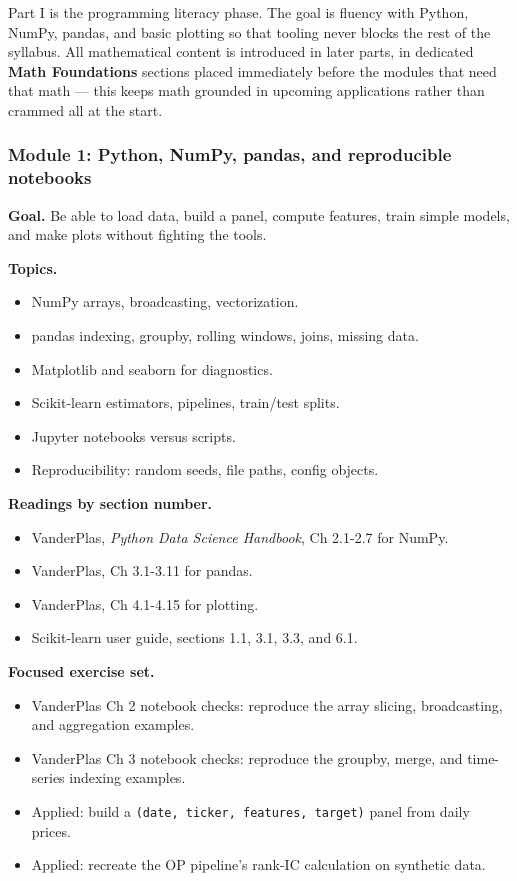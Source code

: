 Part I is the programming literacy phase. The goal is fluency with
Python, NumPy, pandas, and basic plotting so that tooling never blocks
the rest of the syllabus. All mathematical content is introduced in
later parts, in dedicated \textbf{Math Foundations} sections placed
immediately before the modules that need that math --- this keeps math
grounded in upcoming applications rather than crammed all at the start.

\subsubsection{Module 1: Python, NumPy, pandas, and reproducible
notebooks}\label{module-1-python-numpy-pandas-and-reproducible-notebooks}

\textbf{Goal.} Be able to load data, build a panel, compute features,
train simple models, and make plots without fighting the tools.

\textbf{Topics.}

\begin{itemize}
\tightlist
\item
  NumPy arrays, broadcasting, vectorization.
\item
  pandas indexing, groupby, rolling windows, joins, missing data.
\item
  Matplotlib and seaborn for diagnostics.
\item
  Scikit-learn estimators, pipelines, train/test splits.
\item
  Jupyter notebooks versus scripts.
\item
  Reproducibility: random seeds, file paths, config objects.
\end{itemize}

\textbf{Readings by section number.}

\begin{itemize}
\tightlist
\item
  VanderPlas, \emph{Python Data Science Handbook}, Ch 2.1-2.7 for NumPy.
\item
  VanderPlas, Ch 3.1-3.11 for pandas.
\item
  VanderPlas, Ch 4.1-4.15 for plotting.
\item
  Scikit-learn user guide, sections 1.1, 3.1, 3.3, and 6.1.
\end{itemize}

\textbf{Focused exercise set.}

\begin{itemize}
\tightlist
\item
  VanderPlas Ch 2 notebook checks: reproduce the array slicing,
  broadcasting, and aggregation examples.
\item
  VanderPlas Ch 3 notebook checks: reproduce the groupby, merge, and
  time-series indexing examples.
\item
  Applied: build a \texttt{(date,\ ticker,\ features,\ target)} panel
  from daily prices.
\item
  Applied: recreate the OP pipeline's rank-IC calculation on synthetic
  data.
\end{itemize}

